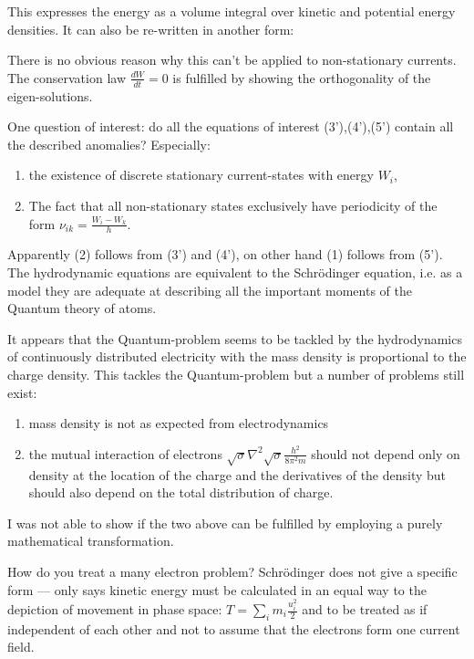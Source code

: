 \noindent This expresses the energy as a volume integral over kinetic and potential energy densities. It can also be re-written in another form:

\noindent There is no obvious reason why this can't be applied to non-stationary currents. The conservation law $\frac{dW}{dt}=0$ is fulfilled by showing the orthogonality of the eigen-solutions.

One question of interest: do all  the equations of interest (3'),(4'),(5') contain all the described anomalies?
Especially:
\begin{enumerate}
\item the existence of discrete stationary current-states with energy $W_i$,
\item The fact that all non-stationary states exclusively have periodicity of the form $\nu_{ik} = \frac{W_i - W_k}{h}$.
\end{enumerate}


Apparently (2) follows from (3') and (4'), on other hand (1) follows from (5'). The hydrodynamic equations are equivalent to the Schr\"odinger equation, i.e. as a model they are adequate at describing all the important moments of the Quantum theory of atoms.

It appears that the Quantum-problem seems to be tackled by the hydrodynamics of continuously distributed electricity with the mass density is proportional to the charge density. This tackles the Quantum-problem but a number of problems still exist:
\begin{enumerate}
\item mass density is not as expected from electrodynamics
\item the mutual interaction of electrons $\sqrt{\sigma}\nabla^2\sqrt{\sigma}\frac{h^2}{8\pi^2 m}$  should not depend only on density at the location of the charge and the derivatives of the density but should also depend on the total distribution of charge.
\end{enumerate}

I was not able to show if the two above can be fulfilled by employing a purely mathematical transformation.

How do you treat a many electron problem? Schr\"odinger does not give a specific form --- only says kinetic energy must be calculated in an equal way to the depiction of movement in phase space: $T = \sum_i m_i \frac{u_i^2}{2}$ and to be treated as if independent of each other and not to assume that the electrons form one current field.

